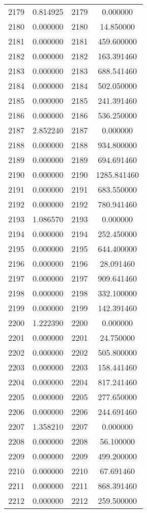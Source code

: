\documentclass[12pt]{article}
\begin{document}
\begin{longtable}{@{}cccc@{}}
2179 & 0.814925 & 2179 & 0.000000 \\
2180 & 0.000000 & 2180 & 14.850000 \\
2181 & 0.000000 & 2181 & 459.600000 \\
2182 & 0.000000 & 2182 & 163.391460 \\
2183 & 0.000000 & 2183 & 688.541460 \\
2184 & 0.000000 & 2184 & 502.050000 \\
2185 & 0.000000 & 2185 & 241.391460 \\
2186 & 0.000000 & 2186 & 536.250000 \\
2187 & 2.852240 & 2187 & 0.000000 \\
2188 & 0.000000 & 2188 & 934.800000 \\
2189 & 0.000000 & 2189 & 694.691460 \\
2190 & 0.000000 & 2190 & 1285.841460 \\
2191 & 0.000000 & 2191 & 683.550000 \\
2192 & 0.000000 & 2192 & 780.941460 \\
2193 & 1.086570 & 2193 & 0.000000 \\
2194 & 0.000000 & 2194 & 252.450000 \\
2195 & 0.000000 & 2195 & 644.400000 \\
2196 & 0.000000 & 2196 & 28.091460 \\
2197 & 0.000000 & 2197 & 909.641460 \\
2198 & 0.000000 & 2198 & 332.100000 \\
2199 & 0.000000 & 2199 & 142.391460 \\
2200 & 1.222390 & 2200 & 0.000000 \\
2201 & 0.000000 & 2201 & 24.750000 \\
2202 & 0.000000 & 2202 & 505.800000 \\
2203 & 0.000000 & 2203 & 158.441460 \\
2204 & 0.000000 & 2204 & 817.241460 \\
2205 & 0.000000 & 2205 & 277.650000 \\
2206 & 0.000000 & 2206 & 244.691460 \\
2207 & 1.358210 & 2207 & 0.000000 \\
2208 & 0.000000 & 2208 & 56.100000 \\
2209 & 0.000000 & 2209 & 499.200000 \\
2210 & 0.000000 & 2210 & 67.691460 \\
2211 & 0.000000 & 2211 & 868.391460 \\
2212 & 0.000000 & 2212 & 259.500000 \\

\end{longtable}
\end{document}

